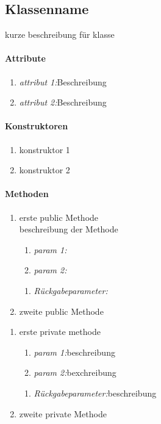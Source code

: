 \subsection{Klassenname}
kurze beschreibung für klasse

\paragraph{Attribute}
\begin{enumerate}[$\bullet$]
\item \textit{attribut 1:}Beschreibung
\item \textit{attribut 2:}Beschreibung
\end{enumerate}

\paragraph{Konstruktoren}
\begin{enumerate}[+]
\item konstruktor 1
\item konstruktor 2
\end{enumerate}

\paragraph{Methoden}

\begin{enumerate}[+]
\item erste public Methode\\
beschreibung der Methode

\begin{enumerate}[$\bullet$]
\item \textit{param 1:}
\item \textit{param 2:}
\end{enumerate}
\vspace{-0.2cm}
\begin{enumerate}[$\circ$]
\item \textit{Rückgabeparameter:}
\end{enumerate}

\item zweite public Methode
\end{enumerate}

\begin{enumerate}[$-$]
\item erste private methode

\begin{enumerate}[$\bullet$]
\item \textit{param 1:}beschreibung
\item \textit{param 2:}bexchreibung
\end{enumerate}
\vspace{-0.2cm}
\begin{enumerate}[$\circ$]
\item \textit{Rückgabeparameter:}beschreibung
\end{enumerate}

\item zweite private Methode
\end{enumerate}